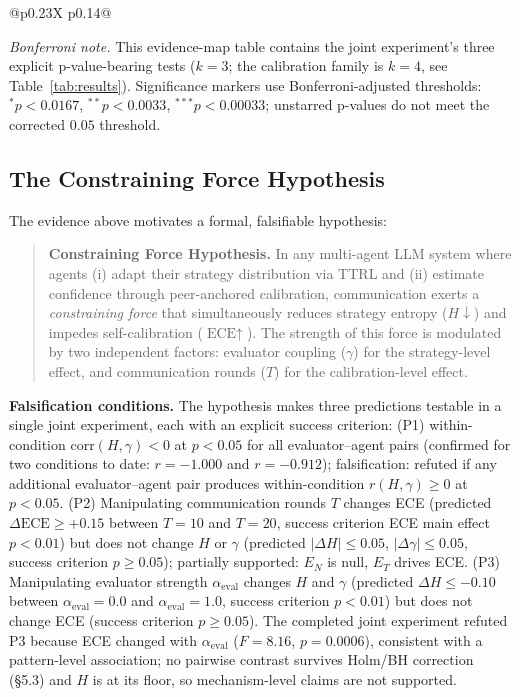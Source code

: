 \documentclass[11pt]{article}
\begin{document}
\begin{table}[t]
\begin{tabularx}{\textwidth}{@{}p{0.23\textwidth}X p{0.14\textwidth}@{}}
\bottomrule
\end{tabularx}
\vspace{0.35em}
\begin{minipage}{0.95\linewidth}
\footnotesize\emph{Bonferroni note.} This evidence-map table contains the joint experiment's three explicit p-value-bearing tests ($k=3$; the calibration family is $k{=}4$, see Table~\ref{tab:results}). Significance markers use Bonferroni-adjusted thresholds: $^{*}p<0.0167$, $^{**}p<0.0033$, $^{***}p<0.00033$; unstarred p-values do not meet the corrected $0.05$ threshold.
\end{minipage}
\end{table}

\subsection{The Constraining Force Hypothesis}

The evidence above motivates a formal, falsifiable hypothesis:

\begin{quote}
\textbf{Constraining Force Hypothesis.} In any multi-agent LLM system where agents (i) adapt their strategy distribution via TTRL and (ii) estimate confidence through peer-anchored calibration, communication exerts a \textit{constraining force} that simultaneously reduces strategy entropy ($H \downarrow$) and impedes self-calibration ($\text{ECE} \uparrow$). The strength of this force is modulated by two independent factors: evaluator coupling ($\gamma$) for the strategy-level effect, and communication rounds ($T$) for the calibration-level effect.
\end{quote}

\textbf{Falsification conditions.} The hypothesis makes three predictions testable in a single joint experiment, each with an explicit success criterion: (P1) within-condition $\text{corr}(H, \gamma) < 0$ at $p < 0.05$ for all evaluator--agent pairs (confirmed for two conditions to date: $r = -1.000$ and $r = -0.912$); falsification: refuted if any additional evaluator--agent pair produces within-condition $r(H, \gamma) \geq 0$ at $p < 0.05$. (P2) Manipulating communication rounds $T$ changes ECE (predicted $\Delta\text{ECE} \geq +0.15$ between $T = 10$ and $T = 20$, success criterion ECE main effect $p < 0.01$) but does not change $H$ or $\gamma$ (predicted $|\Delta H| \leq 0.05$, $|\Delta\gamma| \leq 0.05$, success criterion $p \geq 0.05$); partially supported: $E_N$ is null, $E_T$ drives ECE. (P3) Manipulating evaluator strength $\alpha_{\text{eval}}$ changes $H$ and $\gamma$ (predicted $\Delta H \leq -0.10$ between $\alpha_{\text{eval}} = 0.0$ and $\alpha_{\text{eval}} = 1.0$, success criterion $p < 0.01$) but does not change ECE (success criterion $p \geq 0.05$). The completed joint experiment refuted P3 because ECE changed with $\alpha_{\text{eval}}$ ($F = 8.16$, $p = 0.0006$), consistent with a pattern-level association; no pairwise contrast survives Holm/BH correction (§5.3) and $H$ is at its floor, so mechanism-level claims are not supported.
\end{document}

